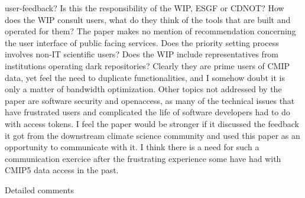 \documentclass[gmd,manuscript]{copernicus}
\begin{document}
\begin{enumerate}[label=RC2-\arabic*,leftmargin=*]
  user-feedback? Is this the responsibility of the WIP, ESGF or CDNOT?
  How does the WIP consult users, what do they think of the tools that
  are built and operated for them? The paper makes no mention of
  recommendation concerning the user interface of public facing
  services. Does the priority setting process involves non-IT
  scientific users? Does the WIP include representatives from
  institutions operating dark repositories? Clearly they are prime
  users of CMIP data, yet feel the need to duplicate functionalities,
  and I somehow doubt it is only a matter of bandwidth optimization.
  Other topics not addressed by the paper are software security and
  openaccess, as many of the technical issues that have frustrated
  users and complicated the life of software developers had to do with
  access tokens. I feel the paper would be stronger if it discussed
  the feedback it got from the downstream climate science community
  and used this paper as an opportunity to communicate with it. I
  think there is a need for such a communication exercice after the
  frustrating experience some have had with CMIP5 data access in the
  past.

  Detailed comments


\end{enumerate}
\end{document}
